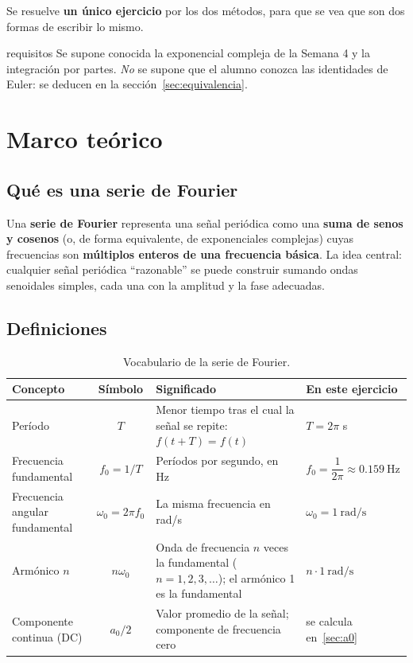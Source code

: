 \documentclass[11pt,a4paper]{article}
\begin{document}
Se resuelve \textbf{un único ejercicio} por los dos métodos, para que se vea que
son dos formas de escribir lo mismo.

\begin{notatec}{requisitos}
Se supone conocida la exponencial compleja de la Semana 4 y la integración por
partes. \emph{No} se supone que el alumno conozca las identidades de Euler: se
deducen en la sección~\ref{sec:equivalencia}.
\end{notatec}

\FloatBarrier
\section{Marco teórico}

\subsection{Qué es una serie de Fourier}
Una \textbf{serie de Fourier} representa una señal periódica como una \textbf{suma
de senos y cosenos} (o, de forma equivalente, de exponenciales complejas) cuyas
frecuencias son \textbf{múltiplos enteros de una frecuencia básica}. La idea
central: cualquier señal periódica ``razonable'' se puede construir sumando
ondas senoidales simples, cada una con la amplitud y la fase adecuadas.

\subsection{Definiciones}
\begin{table}[H]
\centering
\caption{Vocabulario de la serie de Fourier.}
\renewcommand{\arraystretch}{1.5}
\begin{tabularx}{\textwidth}{>{\raggedright\arraybackslash}p{3.7cm}cXl}
\toprule
\textbf{Concepto} & \textbf{Símbolo} & \textbf{Significado} & \textbf{En este ejercicio}\\
\midrule
Período & $T$ & Menor tiempo tras el cual la señal se repite: $f(t+T)=f(t)$ &
  $T=2\pi$ s\\
Frecuencia fundamental & $f_0=1/T$ & Períodos por segundo, en Hz &
  $f_0=\dfrac{1}{2\pi}\approx\qty{0.159}{\hertz}$\\
Frecuencia angular fundamental & $\omega_0=2\pi f_0$ & La misma frecuencia en rad/s &
  $\omega_0=\qty{1}{\radian\per\second}$\\
Armónico $n$ & $n\omega_0$ & Onda de frecuencia $n$ veces la fundamental
  ($n=1,2,3,\dots$); el armónico 1 es la fundamental & $n\cdot\qty{1}{\radian\per\second}$\\
Componente continua (DC) & $a_0/2$ & Valor promedio de la señal; componente de
  frecuencia cero & se calcula en~\ref{sec:a0}\\
\bottomrule
\end{tabularx}
\end{table}
\end{document}
